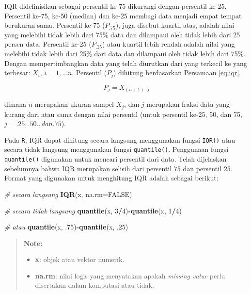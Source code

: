 \documentclass[]{book}
\newenvironment{Shaded}{\begin{snugshade}}{\end{snugshade}}
\newcommand{\KeywordTok}[1]{\textcolor[rgb]{0.13,0.29,0.53}{\textbf{#1}}}
\newcommand{\DataTypeTok}[1]{\textcolor[rgb]{0.13,0.29,0.53}{#1}}
\newcommand{\DecValTok}[1]{\textcolor[rgb]{0.00,0.00,0.81}{#1}}
\newcommand{\CommentTok}[1]{\textcolor[rgb]{0.56,0.35,0.01}{\textit{#1}}}
\newcommand{\OtherTok}[1]{\textcolor[rgb]{0.56,0.35,0.01}{#1}}
\newcommand{\OperatorTok}[1]{\textcolor[rgb]{0.81,0.36,0.00}{\textbf{#1}}}
\newcommand{\NormalTok}[1]{#1}
\providecommand{\tightlist}{%
  \setlength{\itemsep}{0pt}\setlength{\parskip}{0pt}}
\begin{document}
IQR didefinisikan sebagai persentil ke-75 dikurangi dengan persentil
ke-25. Persentil ke-75, ke-50 (median) dan ke-25 membagi data menjadi
empat tempat berukuran sama. Persentil ke-75 (\(P_{.75}\)), juga disebut
kuartil atas, adalah nilai yang melebihi tidak lebih dari 75\% data dan
dilampaui oleh tidak lebih dari 25 persen data. Persentil ke-25
(\(P_{.25}\)) atau kuartil lebih rendah adalah nilai yang melebihi tidak
lebih dari 25\% dari data dan dilampaui oleh tidak lebih dari 75\%.
Dengan mempertimbangkan data yang telah diurutkan dari yang terkecil ke
yang terbesar: \(X_{i}\), \(i=1,...n\). Persentil (\(P_j\)) dihitung
berdasarkan Persamaan \eqref{eq:iqr}.

\begin{equation}
  P_j=X_{\left(n+1\right)\cdot j}
  \label{eq:iqr}
\end{equation}

dimana \(n\) merupakan ukuran sampel \(X_j\), dan \(j\) merupakan fraksi
data yang kurang dari atau sama dengan nilai persentil (untuk persentil
ke-25, 50, dan 75, \(j=.25, .50., dan .75\)).

Pada \texttt{R}, IQR dapat dihitung secara langsung menggunakan fungsi
\texttt{IQR()} atau secara tidak langsung menggunakan fungsi
\texttt{quantile()}. Penggunaan fungsi \texttt{quantile()} digunakan
untuk mencari persentil dari data. Telah dijelaskan sebelumnya bahwa IQR
merupakan selisih dari persentil 75 dan persentil 25. Format yang
digunakan untuk menghitung IQR adalah sebagai berikut:

\begin{Shaded}
\begin{Highlighting}[]
\CommentTok{# secara langsung}
\KeywordTok{IQR}\NormalTok{(x, }\DataTypeTok{na.rm=}\OtherTok{FALSE}\NormalTok{)}

\CommentTok{# secara tidak langsung}
\KeywordTok{quantile}\NormalTok{(x, }\DecValTok{3}\OperatorTok{/}\DecValTok{4}\NormalTok{)}\OperatorTok{-}\KeywordTok{quantile}\NormalTok{(x, }\DecValTok{1}\OperatorTok{/}\DecValTok{4}\NormalTok{)}

\CommentTok{# atau}
\KeywordTok{quantile}\NormalTok{(x, .}\DecValTok{75}\NormalTok{)}\OperatorTok{-}\KeywordTok{quantile}\NormalTok{(x, .}\DecValTok{25}\NormalTok{)}
\end{Highlighting}
\end{Shaded}

\begin{quote}
\textbf{Note:}

\begin{itemize}
\tightlist
\item
  \textbf{x}: objek atau vektor numerik.
\item
  \textbf{na.rm}: nilai logis yang menyatakan apakah \emph{missing
  value} perlu disertakan dalam komputasi atau tidak.
\end{itemize}
\end{quote}
\end{document}

